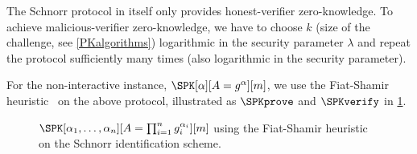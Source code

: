 The Schnorr protocol in itself only provides honest-verifier zero-knowledge.
To achieve malicious-verifier zero-knowledge, we have to choose \(k\) (size of 
the challenge, see \cref{PKalgorithms}) logarithmic in the security parameter 
\(\lambda\) and repeat the protocol sufficiently many times (also logarithmic in 
the security parameter).


For the non-interactive instance, \(\SPK[\alpha][A = g^\alpha][m]\), we use the 
Fiat-Shamir heuristic~\cite{FiatShamirHeuristic} on the above protocol, 
illustrated as \(\SPKprove\) and \(\SPKverify\) in \cref{SPKalgorithms}.

\begin{figure*}
  \begin{minipage}[t]{0.49\linewidth}
    \begin{algorithmic}
        \EndFor{}
      \EndFunction{}
    \end{algorithmic}
  \end{minipage}
  \hfill
  \begin{minipage}[t]{0.49\linewidth}
    \begin{algorithmic}
        \Else{}
        \EndIf{}
      \EndFunction{}
    \end{algorithmic}
  \end{minipage}
  \caption{%
    \(\SPK[\alpha_1, \dotsc, \alpha_n][A = \prod_{i=1}^n g_i^{\alpha_i}][m]\) 
    using the Fiat-Shamir heuristic on the Schnorr identification scheme.
  }%
  \label{SPKalgorithms}
\end{figure*}



